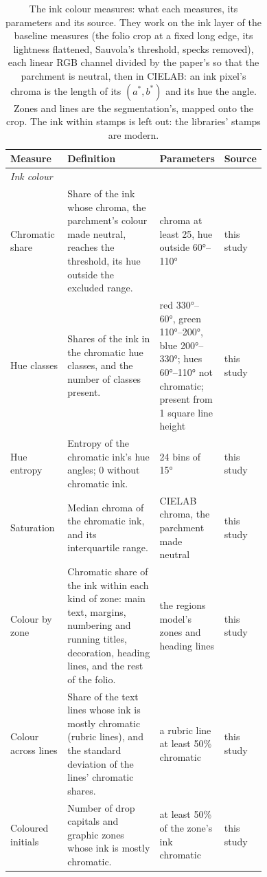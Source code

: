 \begin{table}[htbp]
  \centering
  \caption{The ink colour measures: what each measures, its parameters and its source. They work on the ink layer of the baseline measures (the folio crop at a fixed long edge, its lightness flattened, Sauvola's threshold, specks removed), each linear RGB channel divided by the paper's so that the parchment is neutral, then in CIELAB: an ink pixel's chroma is the length of its $(a^*, b^*)$ and its hue the angle. Zones and lines are the segmentation's, mapped onto the crop. The ink within stamps is left out: the libraries' stamps are modern.}
  \label{tab:colour_measures}
  \begin{tabular}{lp{0.36\linewidth}p{0.24\linewidth}p{0.14\linewidth}}
    \toprule
    Measure & Definition & Parameters & Source \\
    \midrule
    \emph{Ink colour} &  &  &  \\
    Chromatic share & Share of the ink whose chroma, the parchment's colour made neutral, reaches the threshold, its hue outside the excluded range. & chroma at least 25, hue outside 60°--110° & this study \\
    Hue classes & Shares of the ink in the chromatic hue classes, and the number of classes present. & red 330°--60°, green 110°--200°, blue 200°--330°; hues 60°--110° not chromatic; present from 1 square line height & this study \\
    Hue entropy & Entropy of the chromatic ink's hue angles; 0 without chromatic ink. & 24 bins of 15° & this study \\
    Saturation & Median chroma of the chromatic ink, and its interquartile range. & CIELAB chroma, the parchment made neutral & this study \\
    Colour by zone & Chromatic share of the ink within each kind of zone: main text, margins, numbering and running titles, decoration, heading lines, and the rest of the folio. & the regions model's zones and heading lines & this study \\
    Colour across lines & Share of the text lines whose ink is mostly chromatic (rubric lines), and the standard deviation of the lines' chromatic shares. & a rubric line at least 50\% chromatic & this study \\
    Coloured initials & Number of drop capitals and graphic zones whose ink is mostly chromatic. & at least 50\% of the zone's ink chromatic & this study \\
    \bottomrule
  \end{tabular}
\end{table}
